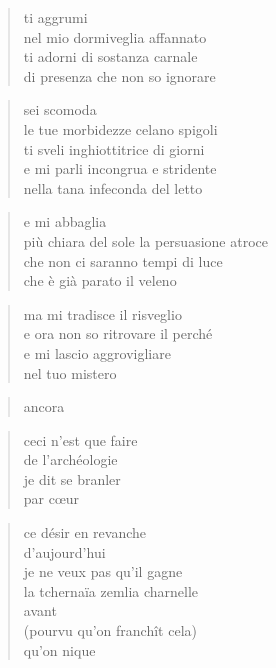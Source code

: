 \clearpage


	\begin{verse}
		ti aggrumi\\
		nel mio dormiveglia affannato\\
		ti adorni di sostanza carnale\\
		di presenza che non so ignorare
	\end{verse}

	\begin{verse}
		sei scomoda\\
		le tue morbidezze celano spigoli\\
		ti sveli inghiottitrice di giorni\\
		e mi parli incongrua e stridente\\
		nella tana infeconda del letto
	\end{verse}

	\begin{verse}
		e mi abbaglia\\
		più chiara del sole la persuasione atroce\\
		che non ci saranno tempi di luce\\
		che è già parato il veleno
	\end{verse}

	\begin{verse}
		ma mi tradisce il risveglio\\
		e ora non so ritrovare il perché\\
		e mi lascio aggrovigliare\\
		nel tuo mistero
	\end{verse}

	\begin{verse}
		ancora
	\end{verse}

\clearpage


	\begin{verse}
		ceci n'est que faire\\
		de l'archéologie\\
		je dit se branler\\
		par cœur
	\end{verse}

	\begin{verse}
		ce désir en revanche\\
		d'aujourd'hui\\
		je ne veux pas qu'il gagne\\
		la tchernaïa zemlia charnelle\\
		avant\\
		(pourvu qu'on franchît cela)\\
		qu'on nique
	\end{verse}

